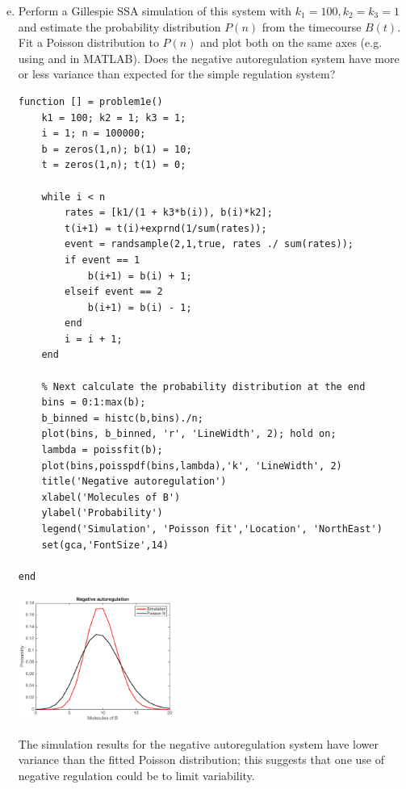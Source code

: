 \documentclass{article}
\begin{document}
\begin{enumerate}[a)]
\setcounter{enumi}{4}
\item Perform a Gillespie SSA simulation of this system with $k_1=100, k_2=k_3=1$ and estimate the probability distribution $P(n)$ from the timecourse $B(t)$. Fit a Poisson distribution to $P(n)$ and plot both on the same axes (e.g. using  and  in MATLAB). Does the negative autoregulation system have more or less variance than expected for the simple regulation system?

\begin{lstlisting}
function [] = problem1e()
    k1 = 100; k2 = 1; k3 = 1;
    i = 1; n = 100000;
    b = zeros(1,n); b(1) = 10;
    t = zeros(1,n); t(1) = 0;
    
    while i < n
        rates = [k1/(1 + k3*b(i)), b(i)*k2];
        t(i+1) = t(i)+exprnd(1/sum(rates));
        event = randsample(2,1,true, rates ./ sum(rates));
        if event == 1
            b(i+1) = b(i) + 1;
        elseif event == 2
            b(i+1) = b(i) - 1;
        end
        i = i + 1;
    end
    
    % Next calculate the probability distribution at the end
    bins = 0:1:max(b);
    b_binned = histc(b,bins)./n;
    plot(bins, b_binned, 'r', 'LineWidth', 2); hold on;
    lambda = poissfit(b);
    plot(bins,poisspdf(bins,lambda),'k', 'LineWidth', 2)
    title('Negative autoregulation')
    xlabel('Molecules of B')
    ylabel('Probability')
    legend('Simulation', 'Poisson fit','Location', 'NorthEast')
    set(gca,'FontSize',14)
    
end
\end{lstlisting}
\begin{center}
\includegraphics[width=0.4\textwidth]{prob1e.pdf}
\end{center}
{\color{red}
The simulation results for the negative autoregulation system have lower variance than the fitted Poisson distribution; this suggests that one use of negative regulation could be to limit variability.
}

\end{enumerate}
\end{document}
